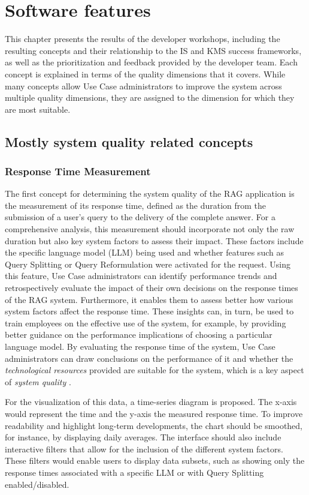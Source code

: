 \documentclass[
	english,
	ruledheaders=section,%
	class=report,%
	thesis={type=bachelor},%
	accentcolor=1b,%
	custommargins=true,%
	marginpar=false,%
	parskip=half-,%
	fontsize=11pt,%
	DIV=14,
]{tudapub}
\begin{document}
\section{Software features}
This chapter presents the results of the developer workshops, including the resulting concepts and their relationship to the IS \parencite{DeloneMcLean2003ISSuccessTenYearUpdate} and KMS success \parencite{Jennex2006} frameworks, as well as the prioritization and feedback provided by the developer team. Each concept is explained in terms of the quality dimensions that it covers. While many concepts allow Use Case administrators to improve the system across multiple quality dimensions, they are assigned to the dimension for which they are most suitable.
\subsection{Mostly system quality related concepts}
\subsubsection{Response Time Measurement}
The first concept for determining the system quality of the RAG application is the measurement of its response time, defined as the duration from the submission of a user's query to the delivery of the complete answer. For a comprehensive analysis, this measurement should incorporate not only the raw duration but also key system factors to assess their impact. These factors include the specific language model (LLM) being used and whether features such as Query Splitting or Query Reformulation were activated for the request. Using this feature, Use Case administrators can identify performance trends and retrospectively evaluate the impact of their own decisions on the response times of the RAG system. Furthermore, it enables them to assess better how various system factors affect the response time. These insights can, in turn, be used to train employees on the effective use of the system, for example, by providing better guidance on the performance implications of choosing a particular language model. By evaluating the response time of the system, Use Case administrators can draw conclusions on the performance of it and whether the \textit{technological resources} provided are suitable for the system, which is a key aspect of \textit{system quality} \parencite[p.~56--57]{Jennex2006}.

For the visualization of this data, a time-series diagram is proposed. The x-axis would represent the time and the y-axis the measured response time. To improve readability and highlight long-term developments, the chart should be smoothed, for instance, by displaying daily averages. The interface should also include interactive filters that allow for the inclusion of the different system factors. These filters would enable users to display data subsets, such as showing only the response times associated with a specific LLM or with Query Splitting enabled/disabled.
\end{document}
